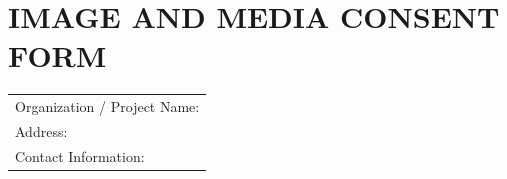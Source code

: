 
\section*{\centering IMAGE AND MEDIA CONSENT FORM}
\vspace*{0.5cm}
\begin{tabularx}{1\textwidth} { 
   >{\raggedright\arraybackslash}X  }
Organization / Project Name:  \\
Address: \\
Contact Information:
\end{tabularx}

